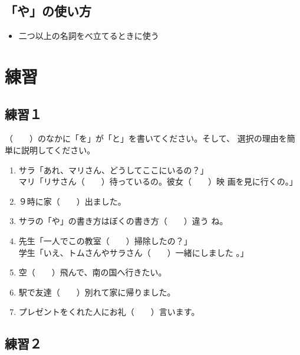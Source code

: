 \documentclass{tufte-handout}
\begin{document}

\subsection{「や」の使い方}%
\label{sub:ya_notsukaekata}

\begin{itemize}
  \item 二つ以上の名詞をべ立てるときに使う
\end{itemize}


\newpage

\section{練習}%
\label{sec:renshuu}

\subsection{練習１}%
\label{sub:renshuu_1}

（　　）のなかに「を」が「と」を書いてください。そして、
選択の理由を簡単に説明してください。

\begin{enumerate}
  \item サラ「あれ、マリさん、どうしてここにいるの？」 \\
    マリ「リサさん（　　）待っているの。彼女（　　）映
    画を見に行くの。」
  \item ９時に家（　　）出ました。
  \item サラの「や」の書き方はぼくの書き方（　　）違う
    ね。
  \item 先生「一人でこの教室（　　）掃除したの？」 \\
    学生「いえ、トムさんやサラさん（　　）一緒にしました
    。」
  \item 空（　　）飛んで、南の国へ行きたい。
  \item 駅で友達（　　）別れて家に帰りました。
  \item プレゼントをくれた人にお礼（　　）言います。
\end{enumerate}


\subsection{練習２}%
\label{sub:renshuu_2}
\end{document}
